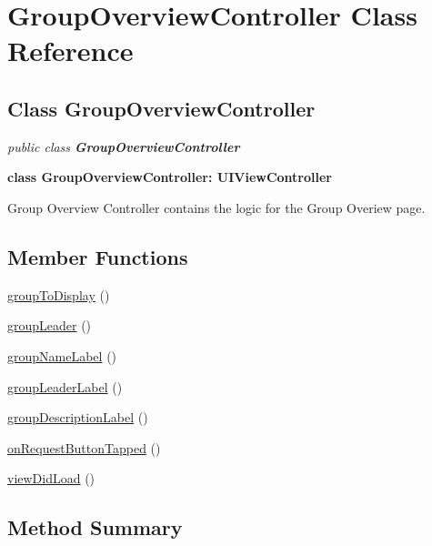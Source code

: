 
\hypertarget{class_GroupOverviewController.iOS}{\section{GroupOverviewController Class Reference}
\label{class_GroupOverviewController.iOS}
}

\subsection*{Class GroupOverviewController}

\textit{public class \textbf{GroupOverviewController}}

\tab \textbf{class GroupOverviewController: UIViewController}

Group Overview Controller contains the logic for the Group Overiew page.\\

\subsection*{Member Functions}
\begin{DoxyCompactItemize}
\item 
\hyperlink{class_GroupOverviewController.iOS.groupToDisplay}{groupToDisplay} ()
\item 
\hyperlink{class_GroupOverviewController.iOS.groupLeader}{groupLeader} ()
\item 
\hyperlink{class_GroupOverviewController.iOS.groupNameLabel}{groupNameLabel} ()
\item 
\hyperlink{class_GroupOverviewController.iOS.groupLeaderLabel}{groupLeaderLabel} ()
\item 
\hyperlink{class_GroupOverviewController.iOS.groupDescriptionLabel}{groupDescriptionLabel} ()
\item 
\hyperlink{class_GroupOverviewController.iOS.onRequestButtonTapped}{onRequestButtonTapped} ()
\item 
\hyperlink{class_GroupOverviewController.iOS.viewDidLoad}{viewDidLoad} ()
\end{DoxyCompactItemize}




\subsection{Method Summary}

